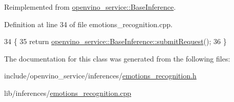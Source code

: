 Reimplemented from \hyperlink{classopenvino__service_1_1BaseInference_a33b93ef057b95bf7968583e4c2eba0c9}{openvino\+\_\+service\+::\+Base\+Inference}.



Definition at line 34 of file emotions\+\_\+recognition.\+cpp.


\begin{DoxyCode}
34                                                       \{
35   \textcolor{keywordflow}{return} \hyperlink{classopenvino__service_1_1BaseInference_a33b93ef057b95bf7968583e4c2eba0c9}{openvino\_service::BaseInference::submitRequest}();
36 \}
\end{DoxyCode}


The documentation for this class was generated from the following files\+:\begin{DoxyCompactItemize}
\item 
include/openvino\+\_\+service/inferences/\hyperlink{emotions__recognition_8h}{emotions\+\_\+recognition.\+h}\item 
lib/inferences/\hyperlink{emotions__recognition_8cpp}{emotions\+\_\+recognition.\+cpp}\end{DoxyCompactItemize}
